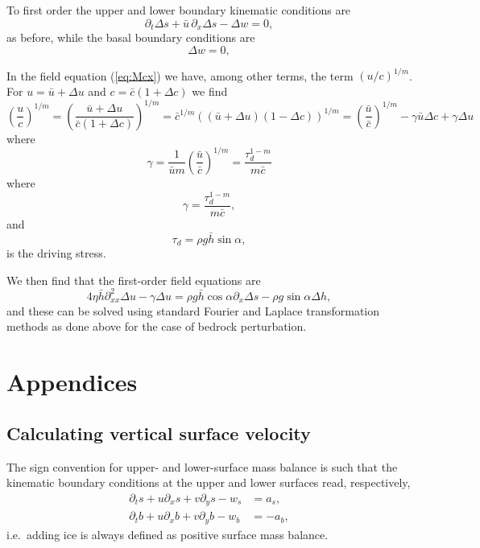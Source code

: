 \documentclass[10pt,a4paper]{book}
\newcommand{\p}{\partial}
\begin{document}
To first order the upper and lower boundary kinematic conditions are	
\begin{equation}	
\p_t \Delta s +\bar{u} \, \p_x \Delta s -\Delta w =0 ,\label{eq:ksc}		
\end{equation}	
as before, while the basal boundary conditions are	
\begin{equation}	
\Delta w =0 ,
\end{equation}	

In the field equation (\ref{eq:Mcx}) we have, among other terms, the
term $(u/c)^{1/m}$. For $u=\bar{u}+\Delta u$ and $c=\bar{c}(1+\Delta
c)$ we find
\[
\left ( \frac{u}{c} \right )^{1/m} = \left 
( \frac{\bar{u}+\Delta u}{\bar{c}(1+\Delta c)}
\right )^{1/m}
=\bar{c}^{1/m} ((\bar{u}+\Delta u)(1-\Delta c))^{1/m}
=\left( \frac{\bar{u}}{\bar{c}}\right )^{1/m} -\gamma \bar{u} \Delta c +\gamma \Delta u
\]
where
\[
\gamma=\frac{1}{\bar{u} m} \left ( \frac{\bar{u}}{\bar{c}} \right )^{1/m} 
= \frac{\tau_d^{1-m}}{m \bar{c}}
\]
where
\begin{equation}
\gamma=\frac{\tau_d^{1-m}}{m \bar{c}} ,
\end{equation}
and 
\begin{equation} 
\tau_d=\rho g \bar{h} \sin \alpha,
\end{equation}
is the driving stress. 

We then find that the first-order field equations are
\begin{equation}
4 \eta \bar{h} \p^2_{xx} \Delta u  -\gamma \Delta u 
=\rho g \bar{h} \cos \alpha \p_x \Delta s - \rho g \sin \alpha \Delta h,
\end{equation}
and these can be solved using standard Fourier and Laplace
transformation methods as done above for the case of bedrock
perturbation.


\part{Appendices}
\appendix



\chapter{Calculating vertical surface velocity}

The sign convention for upper- and lower-surface mass balance is such
that the kinematic boundary conditions at the upper and
lower surfaces read, respectively,
\begin{align} 
\p_t s + u \p_x s +v \p_y s -w_s&=a_s  ,\label{eq:pts} \\
\p_t b + u \p_x b +v \p_y b -w_b&=-a_b ,\label{eq:ptb} 
\end{align}
i.e.\ adding ice is always defined as positive surface mass balance.
\end{document}
